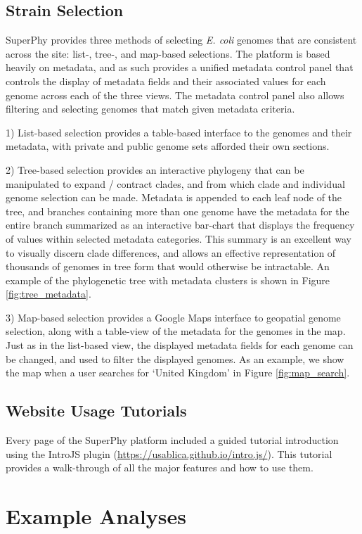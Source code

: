\documentclass[doublespacing, linenumbers]{bmcart}
\begin{document}
\subsection{Strain Selection}
SuperPhy provides three methods of selecting \textit{E. coli} genomes that are consistent across the site: list-, tree-, and map-based selections. The platform is based heavily on metadata, and as such provides a unified metadata control panel that controls the display of metadata fields and their associated values for each genome across each of the three views. The metadata control panel also allows filtering and selecting genomes that match given metadata criteria. 

 1) List-based selection provides a table-based interface to the genomes and their metadata, with private and public genome sets afforded their own sections.

 2) Tree-based selection provides an interactive  phylogeny that can be manipulated to expand / contract clades, and from which clade and individual genome selection can be made. Metadata is appended to each leaf node of the tree, and branches containing more than one genome have the metadata for the entire branch summarized as an interactive bar-chart that displays the frequency of values within selected metadata categories. This summary is an excellent way to visually discern clade differences, and allows an effective representation of thousands of genomes in tree form that would otherwise be intractable. An example of the phylogenetic tree with metadata clusters is shown in Figure \ref{fig:tree_metadata}.

 3) Map-based selection provides a Google Maps interface to geopatial genome selection, along with a table-view of the metadata for the genomes in the map. Just as in the list-based view, the displayed metadata fields for each genome can be changed, and used to filter the displayed genomes. As an example, we show the map when a user searches for `United Kingdom' in Figure \ref{fig:map_search}.

\subsection{Website Usage Tutorials}
Every page of the SuperPhy platform included a guided tutorial  introduction using the IntroJS plugin (\url{https://usablica.github.io/intro.js/}). This tutorial provides a walk-through of all the major features and how to use them. 

\section{Example Analyses}
\end{document}
